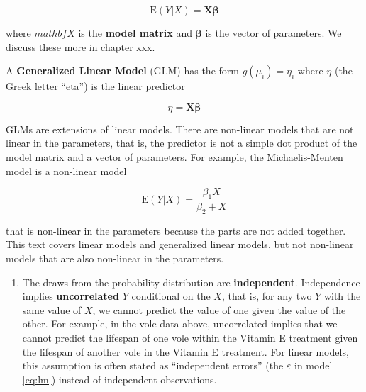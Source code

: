 \documentclass[]{book}
\providecommand{\tightlist}{%
  \setlength{\itemsep}{0pt}\setlength{\parskip}{0pt}}
\begin{document}
\begin{equation}
\mathrm{E}(Y|X) = \mathbf{X}\boldsymbol{\beta}
\end{equation}

where \(mathbf{X}\) is the \textbf{model matrix} and \(\boldsymbol{\beta}\) is the vector of parameters. We discuss these more in chapter xxx.

A \textbf{Generalized Linear Model} (GLM) has the form \(g(\mu_i) = \eta_i\) where \(\eta\) (the Greek letter ``eta'') is the linear predictor

\begin{equation}
\eta = \mathbf{X}\boldsymbol{\beta} 
\end{equation}

GLMs are extensions of linear models. There are non-linear models that are not linear in the parameters, that is, the predictor is not a simple dot product of the model matrix and a vector of parameters. For example, the Michaelis-Menten model is a non-linear model

\begin{equation}
\mathrm{E}(Y|X)  = \frac{\beta_1 X}{\beta_2 + X}
\end{equation}

that is non-linear in the parameters because the parts are not added together. This text covers linear models and generalized linear models, but not non-linear models that are also non-linear in the parameters.

\begin{enumerate}
\def\labelenumi{\arabic{enumi}.}
\setcounter{enumi}{1}
\tightlist
\item
  The draws from the probability distribution are \textbf{independent}. Independence implies \textbf{uncorrelated} \(Y\) conditional on the \(X\), that is, for any two \(Y\) with the same value of \(X\), we cannot predict the value of one given the value of the other. For example, in the vole data above, uncorrelated implies that we cannot predict the lifespan of one vole within the Vitamin E treatment given the lifespan of another vole in the Vitamin E treatment. For linear models, this assumption is often stated as ``independent errors'' (the \(\varepsilon\) in model \eqref{eq:lm}) instead of independent observations.
\end{enumerate}
\end{document}
